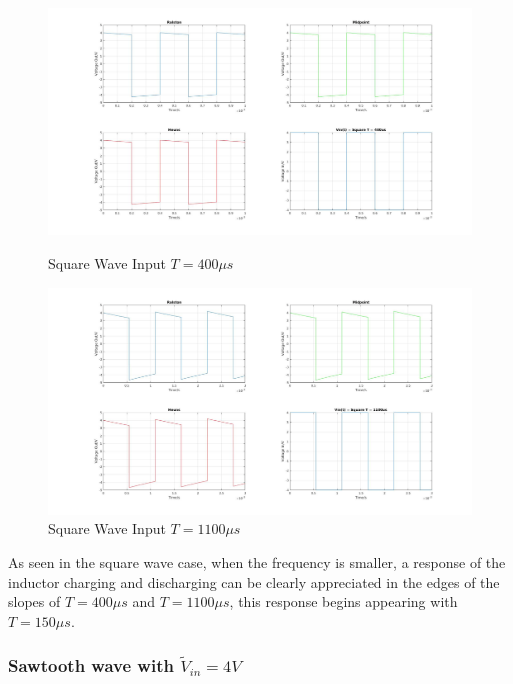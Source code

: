 \documentclass[11pt,a4paper]{article}
\begin{document}
	\begin{figure}[h]
		\vspace{-5mm}
		\centering
		\includegraphics[width=\textwidth]{Ex1_Figs/squ400.jpg}
		\vspace{-10mm}
		\caption{Square Wave Input $T = 400 \mu s$}
		\label{fig:RL11}
		\includegraphics[width=\textwidth]{Ex1_Figs/squ1100.jpg}
		\vspace{-10mm}
		\caption{Square Wave Input $T = 1100 \mu s$}
		\label{fig:RL12}
	\end{figure}

As seen in the square wave case, when the frequency is smaller, a response of the inductor charging and discharging can be clearly appreciated in the edges of the slopes of $T = 400\mu s$ and $T = 1100\mu s$, this response begins appearing with $T = 150\mu s$.

\pagebreak


\FloatBarrier
\subsubsection{Sawtooth wave with $\tilde{V}_{in} = 4V$}
\end{document}
